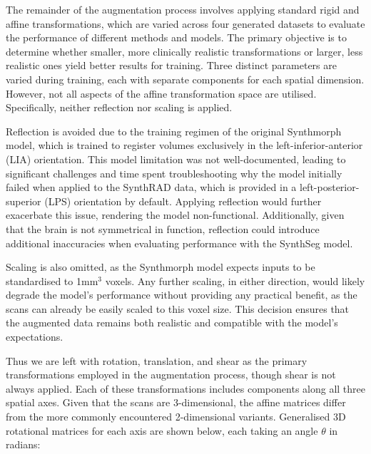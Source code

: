 The remainder of the augmentation process involves applying standard rigid and affine transformations, which are varied across four generated datasets to evaluate the performance of different methods and models. The primary objective is to determine whether smaller, more clinically realistic transformations or larger, less realistic ones yield better results for training. Three distinct parameters are varied during training, each with separate components for each spatial dimension. However, not all aspects of the affine transformation space are utilised. Specifically, neither reflection nor scaling is applied.

Reflection is avoided due to the training regimen of the original Synthmorph model, which is trained to register volumes exclusively in the left-inferior-anterior (LIA) orientation. This model limitation was not well-documented, leading to significant challenges and time spent troubleshooting why the model initially failed when applied to the SynthRAD data, which is provided in a left-posterior-superior (LPS) orientation by default. Applying reflection would further exacerbate this issue, rendering the model non-functional. Additionally, given that the brain is not symmetrical in function, reflection could introduce additional inaccuracies when evaluating performance with the SynthSeg model\cite{synthseg1}\cite{synthseg2}.

Scaling is also omitted, as the Synthmorph model expects inputs to be standardised to 1mm$^3$ voxels. Any further scaling, in either direction, would likely degrade the model's performance without providing any practical benefit, as the scans can already be easily scaled to this voxel size. This decision ensures that the augmented data remains both realistic and compatible with the model's expectations.

Thus we are left with rotation, translation, and shear as the primary transformations employed in the augmentation process, though shear is not always applied. Each of these transformations includes components along all three spatial axes. Given that the scans are 3-dimensional, the affine matrices differ from the more commonly encountered 2-dimensional variants. Generalised 3D rotational matrices for each axis are shown below, each taking an angle $\theta$ in radians:

